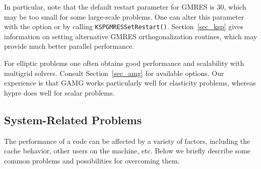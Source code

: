 {{{In particular, note that the default restart parameter for GMRES is
30, which may be too small for some large-scale problems.  One can alter this
parameter with the option  or by
calling \lstinline{KSPGMRESSetRestart()}. Section~\ref{sec_ksp} gives
information on setting alternative GMRES orthogonalization routines,
which may provide much better parallel performance.

For elliptic problems one often obtains good performance and scalability with multigrid solvers.
Consult Section~\ref{sec_amg} for available options.
Our experience is that GAMG works particularly well for elasticity problems, whereas hypre does well for scalar problems.



\subsection{System-Related Problems}

The performance of a code can be affected by a variety of factors,
including the cache behavior, other users on the machine, etc.
Below we briefly describe some common problems and possibilities for
overcoming them.

}}}
